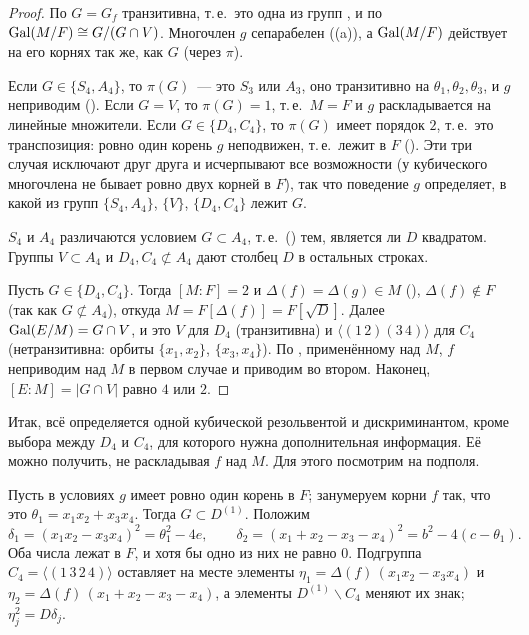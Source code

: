 \begin{proof}
По  $G=G_f$ транзитивна, т.\,е.\ это одна из групп , и по  $\operatorname{Gal}(M/F)\cong G/(G\cap V)$. Многочлен $g$ сепарабелен
((a)), а $\operatorname{Gal}(M/F)$ действует на его корнях так же, как $G$ (через $\pi$).

Если $G\in\{S_4,A_4\}$, то $\pi(G)$~--- это $S_3$ или $A_3$, оно транзитивно на $\theta_1,\theta_2,\theta_3$, и $g$ неприводим ().
Если $G=V$, то $\pi(G)=1$, т.\,е.\ $M=F$ и $g$ раскладывается на линейные множители. Если $G\in\{D_4,C_4\}$, то $\pi(G)$ имеет
порядок $2$, т.\,е.\ это транспозиция: ровно один корень $g$ неподвижен, т.\,е.\ лежит в $F$ (). Эти три случая
исключают друг друга и исчерпывают все возможности (у кубического многочлена не бывает ровно двух корней в $F$), так что
поведение $g$ определяет, в какой из групп $\{S_4,A_4\}$, $\{V\}$, $\{D_4,C_4\}$ лежит $G$.

$S_4$ и $A_4$ различаются условием $G\subset A_4$, т.\,е.\ () тем, является ли $D$ квадратом. Группы $V\subset A_4$ и
$D_4,C_4\not\subset A_4$ дают столбец $D$ в остальных строках.

Пусть $G\in\{D_4,C_4\}$. Тогда $[M:F]=2$ и $\Delta(f)=\Delta(g)\in M$ (), $\Delta(f)\notin F$ (так как $G\not\subset A_4$), откуда
$M=F[\Delta(f)]=F[\sqrt D]$. Далее $\operatorname{Gal}(E/M)=G\cap V$, и это $V$ для $D_4$ (транзитивна) и $\langle(1\,2)(3\,4)\rangle$ для $C_4$
(нетранзитивна: орбиты $\{x_1,x_2\}$, $\{x_3,x_4\}$). По , применённому над $M$, $f$ неприводим над $M$ в первом случае и
приводим во втором. Наконец, $[E:M]=|G\cap V|$ равно $4$ или $2$.
\end{proof}

Итак, всё определяется одной кубической резольвентой и дискриминантом, кроме выбора между $D_4$ и $C_4$, для которого
нужна дополнительная информация. Её можно получить, не раскладывая $f$ над $M$. Для этого посмотрим на подполя.

\begin{proposition}[4.9e]
Пусть в условиях  $g$ имеет ровно один корень в $F$; занумеруем корни $f$ так, что это $\theta_1=x_1x_2+x_3x_4$. Тогда
$G\subset D^{(1)}$. Положим
\[
\delta_1=(x_1x_2-x_3x_4)^2=\theta_1^2-4e,\qquad \delta_2=(x_1+x_2-x_3-x_4)^2=b^2-4(c-\theta_1).
\]
Оба числа лежат в $F$, и хотя бы одно из них не равно $0$. Подгруппа $C_4=\langle(1\,3\,2\,4)\rangle$ оставляет на месте
элементы $\eta_1=\Delta(f)\,(x_1x_2-x_3x_4)$ и $\eta_2=\Delta(f)\,(x_1+x_2-x_3-x_4)$, а элементы $D^{(1)}\smallsetminus C_4$ меняют их знак;
$\eta_j^2=D\delta_j$.
\end{proposition}

